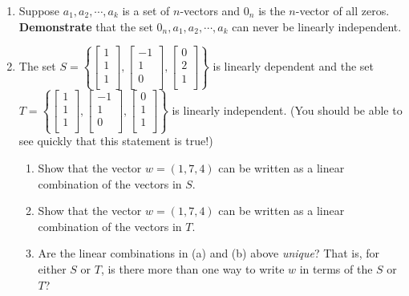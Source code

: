\documentclass[11pt,fleqn]{article}
\newcommand{\bbm}{\begin{bmatrix}}
\newcommand{\ebm}{\end{bmatrix}}
\begin{document}
\begin{enumerate}
\item Suppose $a_1,a_2,\cdots,a_k$ is a set of $n$-vectors and $0_n$ is the $n$-vector of all zeros. \textbf{Demonstrate} that the set $0_n,a_1,a_2,\cdots,a_k$ can never be linearly independent.
\vfill
\newpage
\item The set $S= \left\{ \bbm 1\\1\\1\\ \ebm,\bbm -1\\1\\0\\ \ebm,\bbm 0\\2\\1\\ \ebm \right\}$ is linearly dependent and the set $T=\left\{\bbm 1\\1\\1\\ \ebm,\bbm -1\\1\\0\\ \ebm,\bbm 0\\1\\1\\ \ebm \right\} $ is linearly independent. (You should be able to see quickly that this statement is true!)
	\begin{enumerate}
	\item Show that the vector $w=(1,7,4)$ can be written as a linear combination of the vectors in $S$.
	
	\vfill
	\item Show that the vector $w=(1,7,4)$ can be written as a linear combination of the vectors in $T$.
	
	\vfill

	\item Are the linear combinations in (a) and (b) above \emph{unique}? That is, for either $S$ or $T$, is there more than one way to write $w$ in terms of the $S$ or $T$?
	\vfill
	\end{enumerate}
\end{enumerate}
\end{document}

